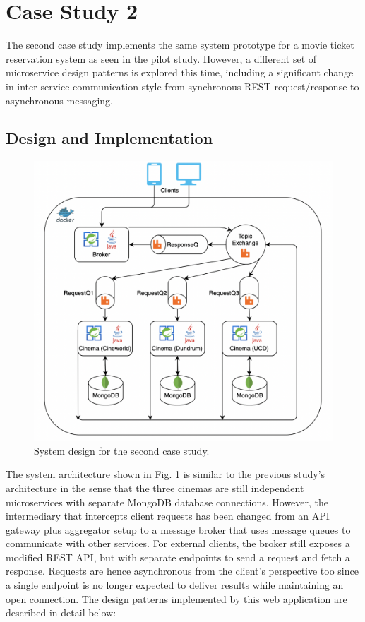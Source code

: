 \section{Case Study 2}

The second case study implements the same system prototype for a movie ticket reservation system as seen in the pilot study. However, a different set of microservice design patterns is explored this time, including a significant change in inter-service communication style from synchronous REST request/response to asynchronous messaging.

\subsection{Design and Implementation}

\begin{figure}[H]
  \centering
  \includegraphics[width=0.6\linewidth]{./assets/diagrams/cs02-arch.png}
  \caption{System design for the second case study.}
  \label{fig:cs02-arch}
\end{figure}

The system architecture shown in Fig. \ref{fig:cs02-arch} is similar to the previous study's architecture in the sense that the three cinemas are still independent microservices with separate MongoDB database connections. However, the intermediary that intercepts client requests has been changed from an API gateway plus aggregator setup to a message broker that uses message queues to communicate with other services. For external clients, the broker still exposes a modified REST API, but with separate endpoints to send a request and fetch a response. Requests are hence asynchronous from the client's perspective too since a single endpoint is no longer expected to deliver results while maintaining an open connection. The design patterns implemented by this web application are described in detail below:


